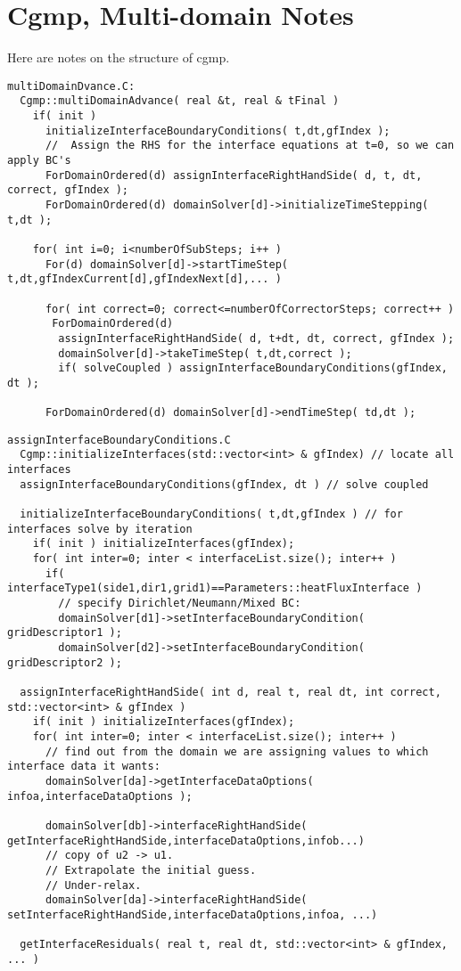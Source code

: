 \section{Cgmp, Multi-domain Notes}\label{sec:cgmpMultiDomain}


Here are notes on the structure of cgmp.
{
\small
\begin{verbatim}
multiDomainDvance.C:
  Cgmp::multiDomainAdvance( real &t, real & tFinal )
    if( init )
      initializeInterfaceBoundaryConditions( t,dt,gfIndex );
      //  Assign the RHS for the interface equations at t=0, so we can apply BC's
      ForDomainOrdered(d) assignInterfaceRightHandSide( d, t, dt, correct, gfIndex );
      ForDomainOrdered(d) domainSolver[d]->initializeTimeStepping( t,dt );

    for( int i=0; i<numberOfSubSteps; i++ )
      For(d) domainSolver[d]->startTimeStep( t,dt,gfIndexCurrent[d],gfIndexNext[d],... )

      for( int correct=0; correct<=numberOfCorrectorSteps; correct++ )
       ForDomainOrdered(d)
        assignInterfaceRightHandSide( d, t+dt, dt, correct, gfIndex );
        domainSolver[d]->takeTimeStep( t,dt,correct );
        if( solveCoupled ) assignInterfaceBoundaryConditions(gfIndex, dt );

      ForDomainOrdered(d) domainSolver[d]->endTimeStep( td,dt );
\end{verbatim}
}
{
\small
\begin{verbatim}
assignInterfaceBoundaryConditions.C
  Cgmp::initializeInterfaces(std::vector<int> & gfIndex) // locate all interfaces
  assignInterfaceBoundaryConditions(gfIndex, dt ) // solve coupled

  initializeInterfaceBoundaryConditions( t,dt,gfIndex ) // for interfaces solve by iteration
    if( init ) initializeInterfaces(gfIndex);
    for( int inter=0; inter < interfaceList.size(); inter++ )
      if( interfaceType1(side1,dir1,grid1)==Parameters::heatFluxInterface ) 
        // specify Dirichlet/Neumann/Mixed BC: 
        domainSolver[d1]->setInterfaceBoundaryCondition( gridDescriptor1 );
        domainSolver[d2]->setInterfaceBoundaryCondition( gridDescriptor2 );

  assignInterfaceRightHandSide( int d, real t, real dt, int correct, std::vector<int> & gfIndex )
    if( init ) initializeInterfaces(gfIndex);
    for( int inter=0; inter < interfaceList.size(); inter++ )
      // find out from the domain we are assigning values to which interface data it wants: 
      domainSolver[da]->getInterfaceDataOptions( infoa,interfaceDataOptions );
 
      domainSolver[db]->interfaceRightHandSide( getInterfaceRightHandSide,interfaceDataOptions,infob...)
      // copy of u2 -> u1.
      // Extrapolate the initial guess.
      // Under-relax.
      domainSolver[da]->interfaceRightHandSide( setInterfaceRightHandSide,interfaceDataOptions,infoa, ...)

  getInterfaceResiduals( real t, real dt, std::vector<int> & gfIndex, ... )

\end{verbatim}
}
